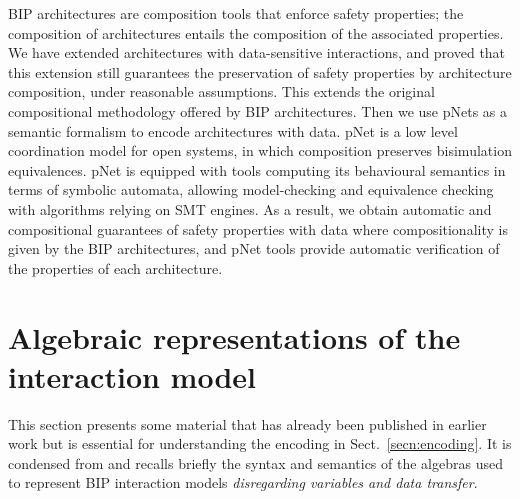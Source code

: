 \documentclass{llncs}
\newcommand{\secn}[1]{Sect.~\ref{secn:#1}}
\begin{document}
BIP architectures are composition tools that enforce safety properties; the composition of architectures entails the composition of the associated properties.
We have extended architectures with data-sensitive interactions, and proved that this extension still guarantees the preservation of safety properties by architecture composition, under reasonable assumptions. This extends the original compositional methodology offered by BIP architectures. Then we use pNets as a semantic formalism to encode architectures with data. pNet is a low level coordination model for open systems, in which composition preserves bisimulation equivalences. pNet is equipped with tools computing its behavioural semantics in terms of symbolic automata, allowing model-checking and equivalence checking with algorithms relying on SMT engines.
As a result, we obtain automatic and compositional guarantees of safety properties with data where compositionality is given by the BIP architectures, and pNet tools provide automatic verification of the properties of each architecture.
%
%
%
%
%
%
%
%





\appendix
\clearpage

\section{Algebraic representations of the interaction model}
\label{secn:algebras}

This section presents some material that has already been published in earlier work but is essential for understanding the encoding in \secn{encoding}.
It is condensed from
\cite[Section~4]{BarBliu15-offer-scico} and recalls briefly the syntax
and semantics of the algebras used to represent BIP interaction models
\emph{disregarding variables and data transfer}.
\end{document}
